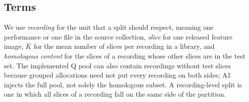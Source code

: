 \subsection{Terms}

We use \emph{recording} for the unit that a split should respect, meaning one performance or one
file in the source collection, \emph{slice} for one released feature image, $\bar K$ for the mean
number of slices per recording in a library, and \emph{homologous content} for the slices of a
recording whose other slices are in the test set. The implemented Q pool can also contain
recordings without test slices because grouped allocations need not put every recording on both
sides; A1 injects the full pool, not solely the homologous subset. A recording-level split is one in which all
slices of a recording fall on the same side of the partition.
